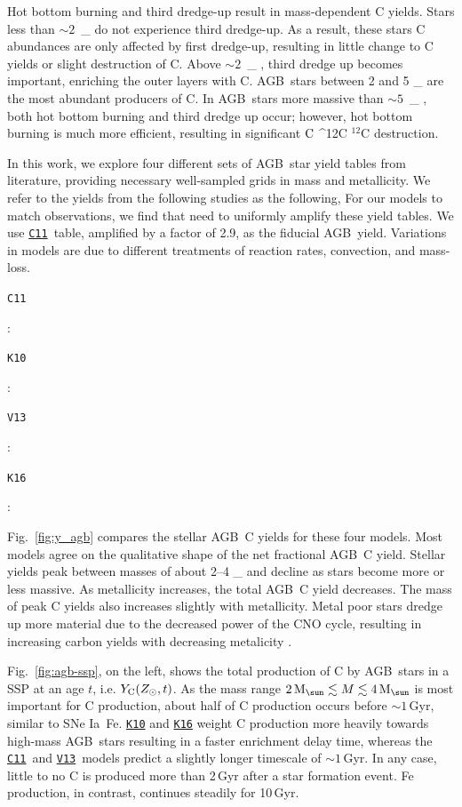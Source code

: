 \documentclass[fleqn,
usenatbib]{mnras}
\makeatletter
\newcommand{\cxi}{\texttt{\hyperlink{C11}{C11}}}
\newcommand{\kx}{\texttt{\hyperlink{K10}{K10}}}
\newcommand{\kxvi}{\texttt{\hyperlink{K16}{K16}}}
\newcommand{\vxiii}{\texttt{\hyperlink{V13}{V13}}}
\newcommand{\agb}{AGB}
\newcommand{\ia}{SNe Ia}
\newcommand{\ssp}{SSP}
\newcommand{\C}[1][\@nil]{
    \def\tmp{#1}%
    \ifx\tmp\@nnil%
        \ensuremath{\rm C}%
    \else%
        \ifmmode ^{#1}{\rm C}%
        \else $^{#1}$C%
        \fi%
\fi }
\newcommand{\y}{Y}
\newcommand{\Mo}{%
    \ifmmode {\rm M}_{\sun}%
    \else {M$_{\sun}$}%
    \fi}
\newcommand{\about}[1]{${\sim} #1$}
\makeatother
\begin{document}
Hot bottom burning and third dredge-up result in mass-dependent C yields. 
Stars less than \about{2}\,\Mo do not experience third dredge-up. As a result, these stars C abundances are only affected by first dredge-up, resulting in little change to C yields or slight destruction of C.
Above \about{2}\,\Mo{}, third dredge up becomes important, enriching the outer layers with C.
\agb\ stars between 2 and 5 \Mo are the most abundant producers of C.
In \agb\ stars more massive than \about{5}\,\Mo, both hot bottom burning and third dredge up occur; however, hot bottom burning is much more efficient, resulting in significant \C[12] destruction.


    In this work, we explore four different sets of \agb\ star yield tables from literature,
    providing necessary well-sampled grids in mass and metallicity. We refer to the yields from the following studies as the following,
For our models to match observations, we find that need to uniformly amplify these yield tables. We use \cxi\ table, amplified by a factor of 2.9, as the fiducial \agb\ yield.
Variations in models are due to different treatments of reaction rates, convection, and mass-loss.
\begin{description}
    \item \hypertarget{C11}{\texttt{C11}}: \citet{cristallo+11, cristallo+15}
    \item \hypertarget{K10}{\texttt{K10}}: \citet{karakas10}
\item \hypertarget{V13}{\texttt{V13}}: \citet{ventura+13,ventura+14,ventura+18, ventura+20}
    \item \hypertarget{K16}{\texttt{K16}}: \citet{KL16, karakas+18}
\end{description}



Fig.~\ref{fig:y_agb} compares the stellar \agb\ C yields for these four models.
Most models agree on the qualitative shape of the net fractional \agb\ C yield.
Stellar yields peak between masses of about 2--4 \Mo and decline as stars become more or less massive. As metallicity increases, the total \agb\ C yield decreases. The mass of peak C yields also increases slightly with metallicity. Metal poor stars dredge up more material due to the decreased power of the CNO cycle, resulting in increasing carbon yields with decreasing metalicity \citep{ventura+13}.

Fig.~\ref{fig:agb-ssp}, on the left, shows the total production of C by \agb\ stars in a \ssp{} at an age $t$, i.e. $\y_{\rm C}(Z_\odot, t)$. 
As the mass range $2\,\Mo\lesssim M \lesssim 4\,\Mo$ is most important for C production, about half of C production occurs before \about{1}\,Gyr, similar to \ia\ Fe. 
\kx{} and \kxvi{} weight C production more heavily towards high-mass \agb\ stars resulting in a faster enrichment delay time, whereas the \cxi\ and \vxiii\ models predict a slightly longer timescale of \about{1}\,Gyr. In any case, little to no C is produced more than 2\,Gyr after a star formation event. Fe production, in contrast, continues steadily for 10\,Gyr. 
\end{document}

